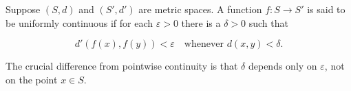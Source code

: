 Suppose $(S, d)$ and $(S', d')$ are metric spaces. A function $f: S \to S'$ is said to be uniformly continuous if for each $\varepsilon > 0$ there is a $\delta > 0$ such that

$$d'(f(x), f(y)) < \varepsilon \quad \text{whenever } d(x, y) < \delta.$$

The crucial difference from pointwise continuity is that $\delta$ depends only on $\varepsilon$, not on the point $x \in S$.
